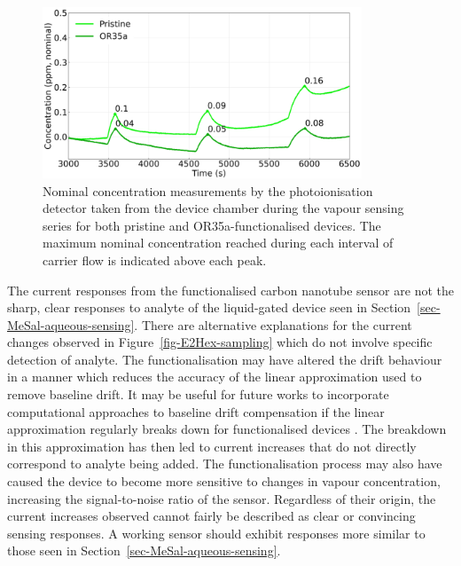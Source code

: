 \documentclass[
  a4paper,
]{scrbook}
\begin{document}
\begin{figure}

{\centering \includegraphics[width=0.85\textwidth,height=\textheight]{figures/ch9/input_time_comparison.png}

}

\caption[Nominal concentration measurements by the photoionisation
detector taken from the device chamber during the vapour sensing series
for both pristine and OR35a-functionalised
devices.]{\label{fig-E2Hex-additions-PID}Nominal concentration
measurements by the photoionisation detector taken from the device
chamber during the vapour sensing series for both pristine and
OR35a-functionalised devices. The maximum nominal concentration reached
during each interval of carrier flow is indicated above each peak.}

\end{figure}

The current responses from the functionalised carbon nanotube sensor are
not the sharp, clear responses to analyte of the liquid-gated device
seen in Section~\ref{sec-MeSal-aqueous-sensing}. There are alternative
explanations for the current changes observed in
Figure~\ref{fig-E2Hex-sampling} which do not involve specific detection
of analyte. The functionalisation may have altered the drift behaviour
in a manner which reduces the accuracy of the linear approximation used
to remove baseline drift. It may be useful for future works to
incorporate computational approaches to baseline drift compensation if
the linear approximation regularly breaks down for functionalised
devices \autocite{Zhang2022}. The breakdown in this approximation has
then led to current increases that do not directly correspond to analyte
being added. The functionalisation process may also have caused the
device to become more sensitive to changes in vapour concentration,
increasing the signal-to-noise ratio of the sensor. Regardless of their
origin, the current increases observed cannot fairly be described as
clear or convincing sensing responses. A working sensor should exhibit
responses more similar to those seen in
Section~\ref{sec-MeSal-aqueous-sensing}.
\end{document}
